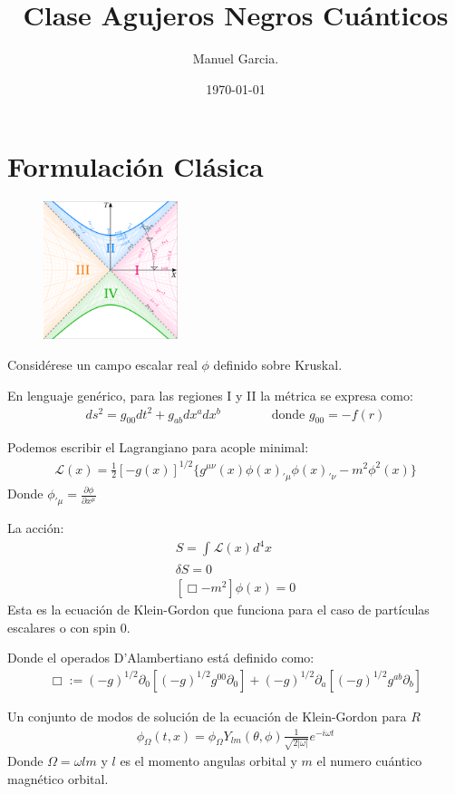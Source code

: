 \documentclass{article}
\title{Clase Agujeros Negros Cuánticos }
\author{Manuel Garcia.}
\date{\today}
\begin{document}
\maketitle

\section{Formulación Clásica }
\begin{figure}[H]
  \begin{center}
    \includegraphics[width=0.35\textwidth]{kruskal.png }
  \end{center}
\end{figure}
Considérese un campo escalar real $ \phi  $ definido sobre Kruskal. 

En lenguaje genérico, para las regiones I y II la métrica se expresa como: 
\begin{gather*}
  ds^2 = g _{00 } dt^2 + g _{ab }  dx^a dx^b  \qquad \qquad \text{donde }g _{00 }  = - f(r)
\end{gather*}

Podemos escribir el Lagrangiano para acople minimal: 
\begin{gather*}
  \mathcal L (x) = \frac{1}{2} [-g(x)]^ {1/2 } \{g ^ {\mu\nu}(x) \phi(x)_{'\mu} \phi(x)_{'\nu} - m^2 \phi^2(x)\} 
\end{gather*}
Donde $ \phi _{'\mu} = \frac{\partial \phi  }{\partial x^\mu}  $

\hfill

La acción: 
\begin{gather*}
  S = \displaystyle\int_{}^{} \mathcal L (x) d^4 x \\
  \delta S = 0 \\
  [\Box - m^2 ] \phi(x) = 0 
\end{gather*}
Esta es la ecuación de Klein-Gordon que funciona para el caso de partículas escalares o con spin 0.

Donde el operados D'Alambertiano está definido como:
\begin{gather*}
  \Box := (-g)^ {1/2 } \partial_0 [(-g)^ {1/2 } g ^ {00 } \partial_0 ] +  (-g)^ {1/2 } \partial_a [(-g)^ {1/2 } g ^ {ab } \partial_b ]
\end{gather*}

\hfill 

Un conjunto de modos de solución de la ecuación de Klein-Gordon para $ R   $
\begin{gather*}
  \phi _\Omega (t,x) = \phi_\Omega Y _{lm } (\theta, \phi ) \frac{1}{\sqrt{2 \left|\omega\right|} } e ^ {-i \omega t }
\end{gather*}
Donde $ \Omega = \omega l m  $ y $ l  $ es el momento angulas orbital y $ m  $ el numero cuántico magnético orbital. 
\end{document}
